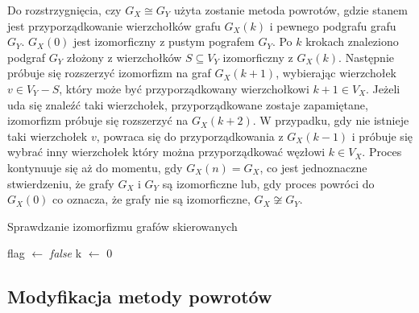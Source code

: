 \documentclass[12pt, a4paper, ]{article} %
\begin{document}
Do rozstrzygnięcia, czy $G_{X} \cong G_{Y}$ użyta zostanie metoda powrotów,
gdzie stanem jest przyporządkowanie wierzchołków grafu $G_{X}(k)$ i pewnego
podgrafu grafu $G_{Y}$. $G_{X}(0)$ jest izomorficzny z pustym pografem $G_{Y}$.
Po $k$ krokach znaleziono podgraf $G_{Y}$ złożony z wierzchołków $S \subseteq
V_{Y}$ izomorficzny z $G_{X}(k)$. Następnie próbuje się rozszerzyć izomorfizm
na graf $G_{X}(k+1)$, wybierając wierzchołek $v \in V_{Y} - S$, który może być
przyporządkowany wierzchołkowi $k+1 \in V_{X}$. Jeżeli uda się znaleźć taki
wierzchołek, przyporządkowane zostaje zapamiętane,  izomorfizm próbuje się
rozszerzyć na $G_{X}(k+2)$. W przypadku, gdy nie istnieje taki wierzchołek $v$,
powraca się do przyporządkowania z $G_{X}(k-1)$ i próbuje się wybrać inny
wierzchołek który można przyporządkować węzłowi $k \in V_{X}$. Proces
kontynuuje się aż do momentu, gdy $G_{X}(n) = G_{X}$, co jest jednoznaczne
stwierdzeniu, że grafy $G_{X}$ i $G_{Y}$ są izomorficzne lub, gdy proces
powróci do $G_{X}(0)$ co oznacza, że grafy nie są izomorficzne, $G_{X}
\not\cong G_{Y}$.

\begin{algorithm}[tp]
    \SetAlgoLined\DontPrintSemicolon{}
    \caption{Sprawdzanie izomorfizmu grafów skierowanych}
    \;
    flag $\leftarrow$ \textit{false}\;
    k $\leftarrow$ 0\;
    \fIsomorph{$\emptyset$}\;
    \;
    \;
\end{algorithm}
\clearpage

\subsection{Modyfikacja metody powrotów}
\end{document}
